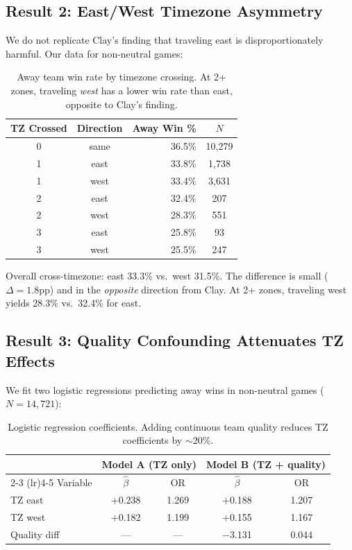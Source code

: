 \documentclass[11pt]{article}
\begin{document}
\subsection{Result 2: East/West Timezone Asymmetry}

We do not replicate Clay's finding that traveling east is disproportionately harmful. Our data for non-neutral games:

\begin{table}[h]
\centering
\begin{tabular}{ccrc}
\toprule
TZ Crossed & Direction & Away Win \% & $N$ \\
\midrule
0 & same & 36.5\% & 10{,}279 \\
1 & east & 33.8\% & 1{,}738 \\
1 & west & 33.4\% & 3{,}631 \\
2 & east & 32.4\% & 207 \\
2 & west & 28.3\% & 551 \\
3 & east & 25.8\% & 93 \\
3 & west & 25.5\% & 247 \\
\bottomrule
\end{tabular}
\caption{Away team win rate by timezone crossing. At 2+ zones, traveling \emph{west} has a lower win rate than east, opposite to Clay's finding.}
\label{tab:tz_asymmetry}
\end{table}

Overall cross-timezone: east 33.3\% vs.\ west 31.5\%. The difference is small ($\Delta = 1.8$pp) and in the \emph{opposite} direction from Clay. At 2+ zones, traveling west yields 28.3\% vs.\ 32.4\% for east.

\subsection{Result 3: Quality Confounding Attenuates TZ Effects}

We fit two logistic regressions predicting away wins in non-neutral games ($N = 14{,}721$):

\begin{table}[h]
\centering
\begin{tabular}{lcccc}
\toprule
& \multicolumn{2}{c}{Model A (TZ only)} & \multicolumn{2}{c}{Model B (TZ + quality)} \\
\cmidrule(lr){2-3} \cmidrule(lr){4-5}
Variable & $\hat{\beta}$ & OR & $\hat{\beta}$ & OR \\
\midrule
TZ east & $+$0.238 & 1.269 & $+$0.188 & 1.207 \\
TZ west & $+$0.182 & 1.199 & $+$0.155 & 1.167 \\
Quality diff & --- & --- & $-$3.131 & 0.044 \\
\bottomrule
\end{tabular}
\caption{Logistic regression coefficients. Adding continuous team quality reduces TZ coefficients by $\sim$20\%.}
\label{tab:logistic}
\end{table}
\end{document}
